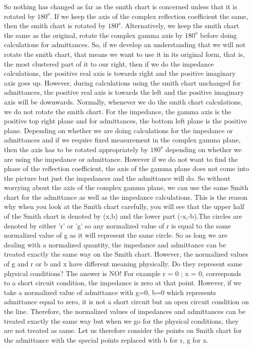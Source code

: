 So nothing has changed as far as the smith chart is concerned unless that it is rotated by $180^o$. If we keep the axis of the complex reflection coefficient the same, then the smith chart is rotated by $180^o$. Alternatively, we keep the smith chart the same as the original, rotate the complex gamma axis by $180^o$ before doing calculations for admittances. So, if we develop an understanding that we will not rotate the smith chart, that means we want to use it in its original form, that is, the most clustered part of it to our right, then if we do the impedance calculations, the positive real axis is towards right and the positive imaginary axis goes up. However, during calculations using the smith chart unchanged for admittances, the positive real axis is towards the left and the  positive imaginary axis will be downwards. Normally, whenever we do the smith chart calculations, we do not rotate the smith chart. For the impedance, the gamma axis is the  positive top right plane and for admittances, the bottom left plane is the positive plane. Depending on whether we are doing calculations for the impedance or admittances and if we require fixed measurement in the complex gamma plane, then the axis has to be rotated appropriately by $180^o$ depending on whether we are using the impedance or admittance. However if we do not want to find the phase of the reflection coefficient, the axis of the gamma plane does not come into the picture but just the impedances and the admittance will do. So without worrying about the axis of the complex gamma plane, we can use the same Smith chart for the admittance as well as the impedance calculations. This is the reason why when you look at the Smith chart carefully, you will see that the upper half of the Smith chart is denoted by (x,b) and the lower part (-x,-b).The circles are denoted by either 'r' or 'g' so any normalized value of r is equal to the same normalized value of g as it will represent the same circle. So as long we are dealing with a normalized quantity, the impedance and admittance can be treated exactly the same way on the Smith chart. However, the normalized values of g and r or b and x have different meaning physically. Do they represent same physical conditions? The answer is NO!  For example r = 0 ; x = 0, corresponds to a short circuit condition, the impedance is zero at that point. However, if we take  a normalized value of admittance with g=0, b=0 which represents admittance equal to zero, it is not a short circuit but an open circuit condition on the line. Therefore, the normalized values of impedances and admittances can be  treated exactly the same way but when we go for the physical conditions, they are not treated as same. Let us therefore consider the points on Smith chart for the admittance with the special points replaced with b for r, g for x.

